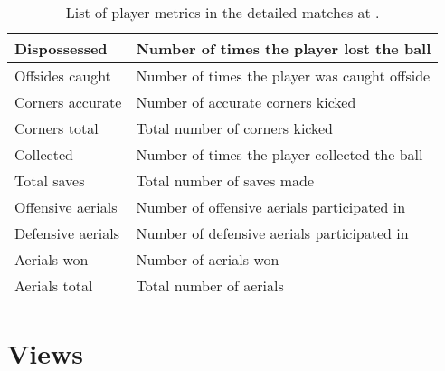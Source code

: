\begin{table}
\begin{tabulary}{\textwidth}{| L | L |}
        Dispossessed            & Number of times the player lost the ball \\\hline
        Offsides caught         & Number of times the player was caught offside \\\hline
        Corners accurate        & Number of accurate corners kicked \\\hline
        Corners total           & Total number of corners kicked \\\hline
        
        Collected               & Number of times the player collected the ball \\\hline
        Total saves             & Total number of saves made \\\hline
        
        Offensive aerials       & Number of offensive aerials participated in \\\hline
        Defensive aerials       & Number of defensive aerials participated in \\\hline
        Aerials won             & Number of aerials won \\\hline
        Aerials total           & Total number of aerials \\\hline
    \end{tabulary}
    \caption{List of player metrics in the detailed matches at \whoscored.}
    \label{tab:whoscored-player-metrics}
\end{table}


\section{Views}

